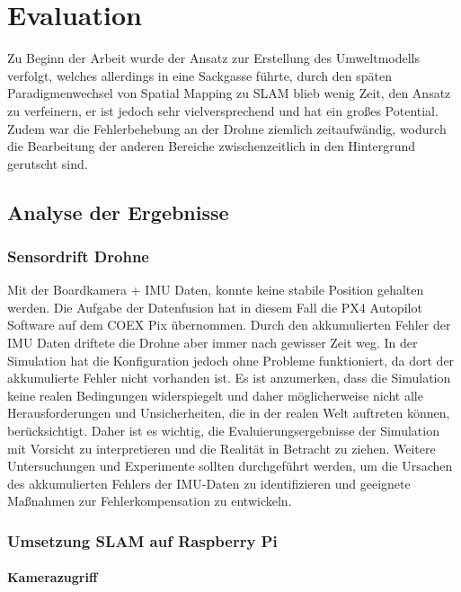 \chapter{Evaluation}

Zu Beginn der Arbeit wurde der Ansatz zur Erstellung des Umweltmodells verfolgt, welches allerdings in eine Sackgasse führte, durch den späten Paradigmenwechsel von Spatial Mapping zu \ac{SLAM} blieb wenig Zeit, den Ansatz zu verfeinern, er ist jedoch sehr vielversprechend und hat ein großes Potential.
Zudem war die Fehlerbehebung an der Drohne ziemlich zeitaufwändig, wodurch die Bearbeitung der anderen Bereiche zwischenzeitlich in den Hintergrund gerutscht sind.

\section{Analyse der Ergebnisse}
\subsection{Sensordrift Drohne}

Mit der Boardkamera + \ac{IMU} Daten, konnte keine stabile Position gehalten werden. Die Aufgabe der Datenfusion hat in diesem Fall die PX4 Autopilot Software auf dem COEX Pix übernommen.
Durch den akkumulierten Fehler der \ac{IMU} Daten driftete die Drohne aber immer nach gewisser Zeit weg. In der Simulation hat die Konfiguration jedoch ohne Probleme funktioniert, da dort der akkumulierte Fehler nicht vorhanden ist.
Es ist anzumerken, dass die Simulation keine realen Bedingungen widerspiegelt und daher möglicherweise nicht alle Herausforderungen und Unsicherheiten, die in der realen Welt auftreten können, berücksichtigt. Daher ist es wichtig, die Evaluierungsergebnisse der Simulation mit Vorsicht zu interpretieren und die Realität in Betracht zu ziehen. Weitere Untersuchungen und Experimente sollten durchgeführt werden, um die Ursachen des akkumulierten Fehlers der \ac{IMU}-Daten zu identifizieren und geeignete Maßnahmen zur Fehlerkompensation zu entwickeln.


\subsection{Umsetzung SLAM auf Raspberry Pi}

\subsubsection{Kamerazugriff}

